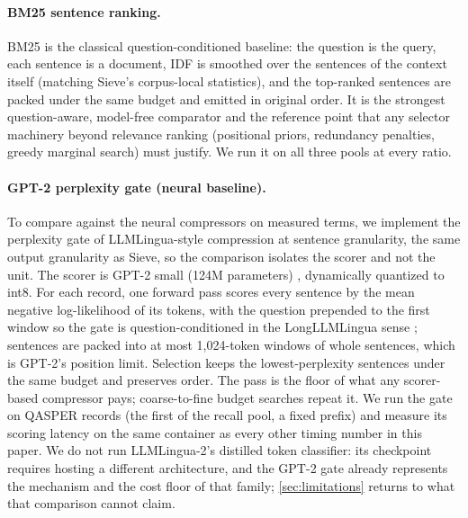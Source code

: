 \documentclass[preprint,12pt]{elsarticle}
\theoremstyle{remark}
\newcommand{\method}{Sieve}
\begin{document}
\paragraph{BM25 sentence ranking.}
BM25 \citep{robertson2009bm25} is the classical question-conditioned
baseline: the question is the query, each sentence is a document, IDF
is smoothed over the sentences of the context itself (matching
\method{}'s corpus-local statistics), and the top-ranked sentences are
packed under the same budget and emitted in original order. It is the
strongest question-aware, model-free comparator and the reference
point that any selector machinery beyond relevance ranking
(positional priors, redundancy penalties, greedy marginal search)
must justify. We run it on all three pools at every ratio.

\paragraph{GPT-2 perplexity gate (neural baseline).}
To compare against the neural compressors on measured terms, we
implement the perplexity gate of LLMLingua-style compression
\citep{jiang2023llmlingua} at sentence granularity, the same output
granularity as \method{}, so the comparison isolates the scorer and
not the unit. The scorer is GPT-2 small (124M parameters)
\citep{radford2019gpt2}, dynamically quantized to int8. For each
record, one forward pass scores every sentence by the mean negative
log-likelihood of its tokens, with the question prepended to the
first window so the gate is question-conditioned in the LongLLMLingua
sense \citep{jiang2023longllmlingua}; sentences are packed into at
most 1{,}024-token windows of whole sentences, which is GPT-2's
position limit. Selection keeps the lowest-perplexity sentences under
the same budget and preserves order. The pass is the floor of what
any scorer-based compressor pays; coarse-to-fine budget searches
repeat it. We run the gate on \GateN{} QASPER records (the first
\GateN{} of the recall pool, a fixed prefix) and measure its scoring
latency on the same container as every other timing number in this
paper. We do not run LLMLingua-2's distilled token classifier: its
checkpoint requires hosting a different architecture, and the GPT-2
gate already represents the mechanism and the cost floor of that
family; \autoref{sec:limitations} returns to what that comparison
cannot claim.
\end{document}
